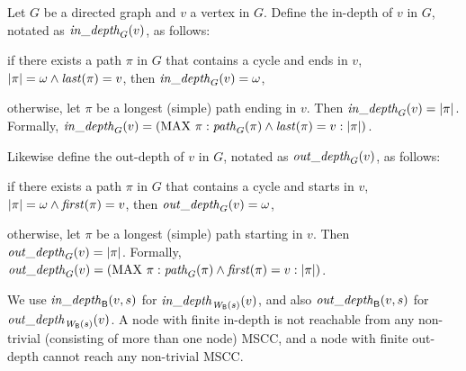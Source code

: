 \begin{definition} \label{def:depth} \label{defn:depth} 
Let $G$ be a directed graph and $v$ a vertex in $G$. Define the in-depth of $v$ in $G$, notated as
$\mathit{in\_depth}_{G}({v})$, as follows:
\be
\item if there exists a path $\pi$ in $G$ that contains a cycle and ends in $v$, \ie $|\pi| = \omega
  \land \mathit{last}(\pi) = v$, then $\mathit{in\_depth}_{G}({v}) = \omega$,

\item otherwise, let $\pi$ be a longest (simple) path ending in $v$. Then $\mathit{in\_depth}_{G}({v}) = |\pi|$.
\ee
Formally, $\mathit{in\_depth}_{G}({v}) = (\mathrm{MAX}\ \pi : \mathit{path}_{G}(\pi) \land \mathit{last}(\pi) = v : |\pi|)$.

Likewise define the out-depth of $v$ in $G$, notated as
$\mathit{out\_depth}_{G}({v})$, as follows:
\be
\item if there exists a path $\pi$ in $G$ that contains a cycle and starts in $v$, \ie $|\pi| = \omega
  \land \mathit{first}(\pi) = v$, then $\mathit{out\_depth}_{G}({v}) = \omega$,

\item otherwise, let $\pi$ be a longest (simple) path starting in $v$. Then $\mathit{out\_depth}_{G}({v}) = |\pi|$.
\ee
Formally, $\mathit{out\_depth}_{G}({v}) = (\mathrm{MAX}\ \pi : \mathit{path}_{G}(\pi) \land \mathit{first}(\pi) = v : |\pi|)$.
\end{definition}

\noindent
We use $\mathit{in\_depth}_{\mathsf{B}}({v, s})$ for $\mathit{in\_depth}_{\mathit{W}_{\mathsf{B}}({s})}({v})$, and also
$\mathit{out\_depth}_{\mathsf{B}}({v, s})$ for $\mathit{out\_depth}_{\mathit{W}_{\mathsf{B}}({s})}({v})$.
%
A node with finite in-depth is not reachable from any non-trivial (\ie consisting of more than one node) MSCC, and a node with finite out-depth cannot
reach any non-trivial MSCC.







